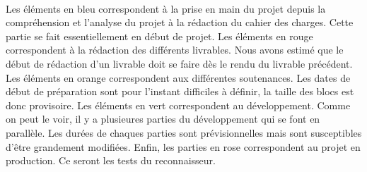 \paragraph{}
Les éléments en bleu correspondent à la prise en main du projet depuis la compréhension et l’analyse du projet
à la rédaction du cahier des charges. Cette partie se fait essentiellement en début de projet. Les éléments en rouge
correspondent à la rédaction des différents livrables. Nous avons estimé que le début de rédaction d’un livrable
doit se faire dès le rendu du livrable précédent. Les éléments en orange correspondent aux différentes soutenances.
Les dates de début de préparation sont pour l’instant difficiles à définir, la taille des blocs est donc provisoire.
Les éléments en vert correspondent au développement. Comme on peut le voir, il y a plusieures parties du développement
qui se font en parallèle. Les durées de chaques parties sont prévisionnelles mais sont susceptibles d’être grandement modifiées.
Enfin, les parties en rose correspondent au projet en production. Ce seront les tests du reconnaisseur.